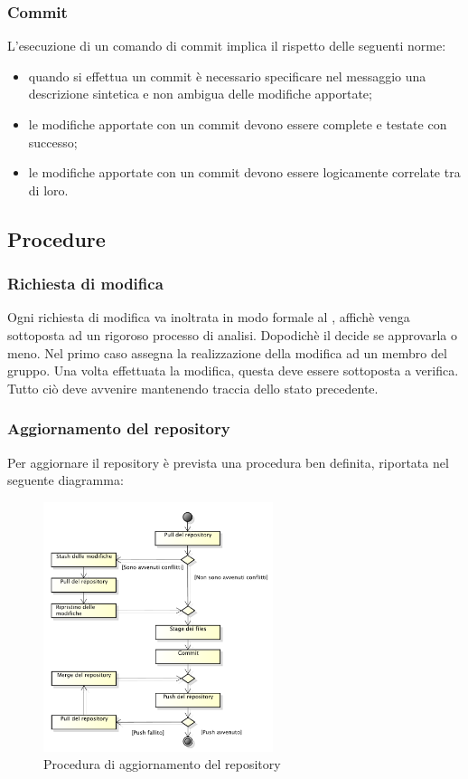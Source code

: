 			\subsubsection{Commit}
				L'esecuzione di un comando di commit implica il rispetto delle seguenti norme:
				\begin{itemize}
					\item quando si effettua un commit è necessario specificare nel messaggio una descrizione sintetica e non ambigua delle modifiche apportate;
					\item le modifiche apportate con un commit devono essere complete e testate con successo;
					\item le modifiche apportate con un commit devono essere logicamente correlate tra di loro.
				\end{itemize}
	
	\subsection{Procedure}
		\subsubsection{Richiesta di modifica}
		Ogni richiesta di modifica va inoltrata in modo formale al , affichè venga sottoposta ad un rigoroso processo di analisi. Dopodichè il  decide se approvarla o meno. Nel primo caso assegna la realizzazione della modifica ad un membro del gruppo. Una volta effettuata la modifica, questa deve essere sottoposta a verifica. Tutto ciò deve avvenire mantenendo traccia dello stato precedente.
		
		\subsubsection{Aggiornamento del repository}
				Per aggiornare il repository è prevista una procedura ben definita, riportata nel seguente diagramma:
				\begin{figure}[H]
					\centering
					\includegraphics[width=0.6\textwidth]{NormeDiProgetto/Pics/Commit}
					\caption{Procedura di aggiornamento del repository}
				\end{figure}
		
